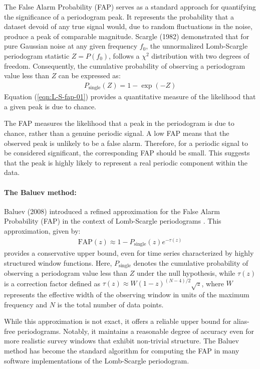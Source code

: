     			The False Alarm Probability (FAP) serves as a standard approach for quantifying the significance of a periodogram peak. It represents the probability that a dataset devoid of any true signal would, due to random fluctuations in the noise, produce a peak of comparable magnitude. Scargle (1982) demonstrated that for pure Gaussian noise at any given frequency $f_0$, the unnormalized Lomb-Scargle periodogram statistic $Z=P(f_0)$, follows a $\chi^2$ distribution with two degrees of freedom. Consequently, the cumulative probability of observing a periodogram value less than $Z$ can be expressed as:
    			\begin{align}
    				P_\text{single}(Z)=1-\exp(-Z) \label{eqn:L-S-fap-01}
    			\end{align}
    			Equation (\ref{eqn:L-S-fap-01}) provides a quantitative measure of the likelihood that a given peak is due to chance.
    			
    			The FAP measures the likelihood that a peak in the periodogram is due to chance, rather than a genuine periodic signal. A low FAP means that the observed peak is unlikely to be a false alarm. Therefore, for a periodic signal to be considered significant, the corresponding FAP should be small. This suggests that the peak is highly likely to represent a real periodic component within the data.
    			
    			\paragraph{The Baluev method:}
    			Baluev (2008) introduced a refined approximation for the False Alarm Probability (FAP) in the context of Lomb-Scargle periodograms \cite{baluev2008assessing}. This approximation, given by:
    			\begin{align}
    				\text{FAP}(z)\approx 1 - P_\text{single}(z)e^{-\tau(z)}\label{eqn:L-S-fap-baluev-01}
    			\end{align}
    			provides a conservative upper bound, even for time series characterized by highly structured window functions. Here, $P_\text{single}$ denotes the cumulative probability of observing a periodogram value less than $Z$ under the null hypothesis, while $\tau(z)$ is a correction factor defined as $\tau(z)\approx W(1 - z)^{(N-4)/2}\sqrt{z}$, where $W$ represents the effective width of the observing window in units of the maximum frequency and $N$ is the total number of data points.
    			
    			While this approximation is not exact, it offers a reliable upper bound for alias-free periodograms. Notably, it maintains a reasonable degree of accuracy even for more realistic survey windows that exhibit non-trivial structure. The Baluev method has become the standard algorithm for computing the FAP in many software implementations of the Lomb-Scargle periodogram.
    		
